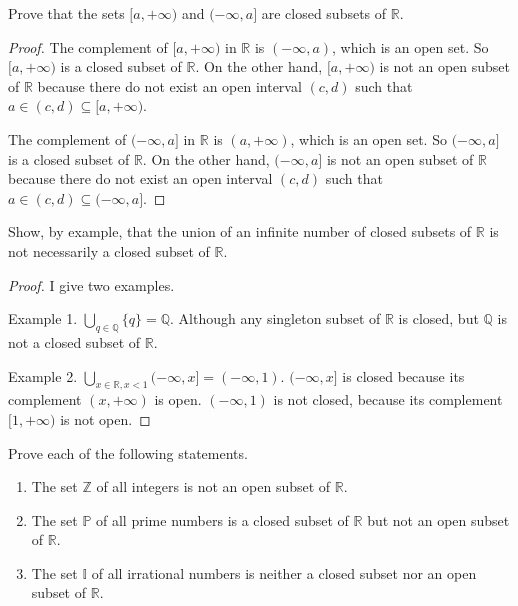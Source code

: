 \begin{exercise}
	Prove that the sets $[a, +\infty)$ and $(-\infty, a]$ are closed subsets of $\mathbb{R}$.
\end{exercise}

\begin{proof}
	The complement of $[a, +\infty)$ in $\mathbb{R}$ is $(-\infty, a)$, which is an open set. So $[a, +\infty)$ is a closed subset of $\mathbb{R}$. On the other hand, $[a, +\infty)$ is not an open subset of $\mathbb{R}$ because there do not exist an open interval $(c, d)$ such that $a\in (c, d)\subseteq [a, +\infty)$.

										The complement of $(-\infty, a]$ in $\mathbb{R}$ is $(a, +\infty)$, which is an open set. So $(-\infty, a]$ is a closed subset of $\mathbb{R}$. On the other hand, $(-\infty, a]$ is not an open subset of $\mathbb{R}$ because there do not exist an open interval $(c, d)$ such that $a\in (c, d)\subseteq (-\infty, a]$.
\end{proof}
\newpage

\begin{exercise}
	Show, by example, that the union of an infinite number of closed subsets of $\mathbb{R}$ is not necessarily a closed subset of $\mathbb{R}$.
\end{exercise}

\begin{proof}
	I give two examples.

	Example 1. $\bigcup_{q\in\mathbb{Q}} \{ q \} = \mathbb{Q}$. Although any singleton subset of $\mathbb{R}$ is closed, but $\mathbb{Q}$ is not a closed subset of $\mathbb{R}$.

	Example 2. $\bigcup_{x\in\mathbb{R}, x < 1} (-\infty, x] = (-\infty, 1)$. $(-\infty, x]$ is closed because its complement $(x, +\infty)$ is open. $(-\infty, 1)$ is not closed, because its complement $[1, +\infty)$ is not open.
\end{proof}
\newpage

\begin{exercise}
	Prove each of the following statements.
	\begin{enumerate}[label={(\roman*)}]
		\item The set $\mathbb{Z}$ of all integers is not an open subset of $\mathbb{R}$.
		\item The set $\mathbb{P}$ of all prime numbers is a closed subset of $\mathbb{R}$ but not an open subset of $\mathbb{R}$.
		\item The set $\mathbb{I}$ of all irrational numbers is neither a closed subset nor an open subset of $\mathbb{R}$.
	\end{enumerate}
\end{exercise}

